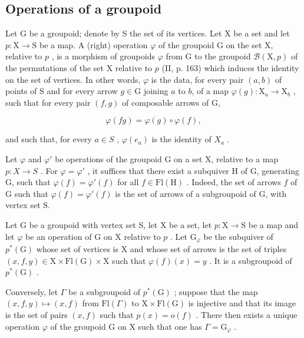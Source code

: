 \subsection{Operations of a groupoid}

Let G be a groupoid; denote by S the set of its vertices. Let X be a set and let \(p\colon \mathrm{X}\to \mathrm{S}\) be a map. A (right) operation \(\varphi\) of the groupoid G on the set X, relative to \(p\) , is a morphism of groupoids \(\varphi\) from G to the groupoid \(\mathcal{B}(\mathrm{X},p)\) of the permutations of the set X relative to \(p\) (II, p. 163) which induces the identity on the set of vertices. In other words, \(\varphi\) is the data, for every pair \((a,b)\) of points of S and for every arrow \(g\in \mathrm{G}\) joining \(a\) to \(b\), of a map \(\varphi (g)\colon \mathrm{X}_a\to \mathrm{X}_b\) , such that for every pair \((f,g)\) of composable arrows of G,

\[
\varphi (f g) = \varphi (g) \circ \varphi (f),
\]

and such that, for every \(a \in S\) , \(\varphi(e_a)\) is the identity of \(X_a\) .

Let \(\varphi\) and \(\varphi'\) be operations of the groupoid G on a set X, relative to a map \(p\colon X\to S\) . For \(\varphi=\varphi'\) , it suffices that there exist a subquiver H of G, generating G, such that \(\varphi(f)=\varphi'(f)\) for all \(f\in\mathrm{Fl}(\mathrm{H})\) . Indeed, the set of arrows \(f\) of G such that \(\varphi(f)=\varphi'(f)\) is the set of arrows of a subgroupoid of G, with vertex set S.

Let G be a groupoid with vertex set S, let X be a set, let \(p \colon \mathrm{X} \to \mathrm{S}\) be a map and let \(\varphi\) be an operation of G on X relative to \(p\) . Let \(\mathrm{G}_{\varphi}\) be the subquiver of \(p^{*}(\mathrm{G})\) whose set of vertices is X and whose set of arrows is the set of triples \((x, f, y) \in \mathrm{X} \times \mathrm{Fl}(\mathrm{G}) \times \mathrm{X}\) such that \(\varphi(f)(x) = y\) . It is a subgroupoid of \(p^{*}(\mathrm{G})\) .

Conversely, let \(\Gamma\) be a subgroupoid of \(p^{*}(\mathrm{G})\) ; suppose that the map \((x,f,y)\mapsto (x,f)\) from \(\mathrm{Fl}(\Gamma)\) to \(\mathrm{X}\times \mathrm{Fl}(\mathrm{G})\) is injective and that its image is the set of pairs \((x,f)\) such that \(p(x) = o(f)\) . There then exists a unique operation \(\varphi\) of the groupoid G on X such that one has \(\Gamma = \mathrm{G}_{\varphi}\) .

